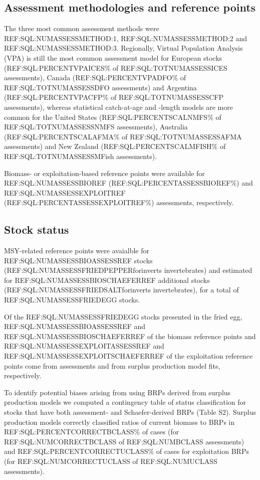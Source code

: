 \subsection*{Assessment methodologies and reference points}
\noindent
The three most common assessment methods were
REF:SQL:NUMASSESSMETHOD:1, REF:SQL:NUMASSESSMETHOD:2 and
REF:SQL:NUMASSESSMETHOD:3. Regionally, Virtual Population Analysis
(VPA) is still the most common assessment model for European stocks
(REF:SQL:PERCENTVPAICES\% of REF:SQL:TOTNUMASSESSICES assessments),
Canada (REF:SQL:PERCENTVPADFO\% of REF:SQL:TOTNUMASSESSDFO
assessments) and Argentina (REF:SQL:PERCENTVPACFP\% of
REF:SQL:TOTNUMASSESSCFP assessments), whereas statistical catch-at-age
and -length models are more common for the United States
(REF:SQL:PERCENTSCALNMFS\% of REF:SQL:TOTNUMASSESSNMFS assessments),
Australia (REF:SQL:PERCENTSCALAFMA\% of REF:SQL:TOTNUMASSESSAFMA
assessments) and New Zealand (REF:SQL:PERCENTSCALMFISH\% of
REF:SQL:TOTNUMASSESSMFish assessments).

Biomass- or exploitation-based reference points were available for
REF:SQL:NUMASSESSBIOREF (REF:SQL:PERCENTASSESSBIOREF\%) and
REF:SQL:NUMASSESSEXPLOITREF (REF:SQL:PERCENTASSESSEXPLOITREF\%)
assessments, respectively.

\subsection*{Stock status}
\noindent

MSY-related reference points were avaialble for
REF:SQL:NUMASSESSBIOASSESSREF stocks
(REF:SQL:NUMASSESSFRIEDPEPPERforinverts invertebrates) and estimated
for REF:SQL:NUMASSESSBIOSCHAEFERREF additional stocks
(REF:SQL:NUMASSESSFRIEDSALTforinverts invertebrates), for a total of
REF:SQL:NUMASSESSFRIEDEGG stocks.

Of the
REF:SQL:NUMASSESSFRIEDEGG stocks presented in
the fried egg, REF:SQL:NUMASSESSBIOASSESSREF and
REF:SQL:NUMASSESSBIOSCHAEFERREF of the biomass reference points and
REF:SQL:NUMASSESSEXPLOITASSESSREF and
REF:SQL:NUMASSESSEXPLOITSCHAEFERREF of the exploitation reference
points come from assessments and from surplus production model fits,
respectively.

To identify potential biases arising from using BRPs
derived from surplus production models we computed a contingency table
of status classification for stocks that have both assessment- and
Schaefer-derived BRPs (Table S2). Surplus production models correctly
classified ratios of current biomass to BRPs in
REF:SQL:PERCENTCORRECTBCLASS\% of cases (for REF:SQL:NUMCORRECTBCLASS
of REF:SQL:NUMBCLASS assessments) and REF:SQL:PERCENTCORRECTUCLASS\%
of cases for exploitation BRPs (for REF:SQL:NUMCORRECTUCLASS of
REF:SQL:NUMUCLASS assessments).

